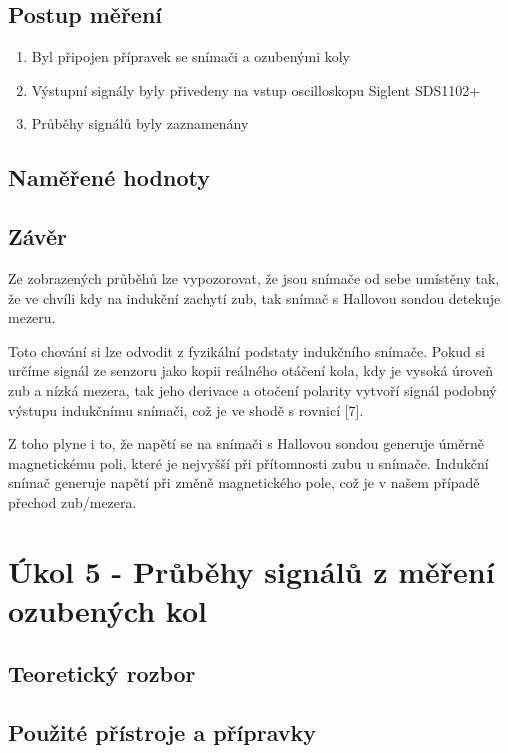 \documentclass{protokol}
\begin{document}
    \subsection{Postup měření}
            \begin{enumerate}
            \item Byl připojen přípravek se snímači a ozubenými koly
            \item Výstupní signály byly přivedeny na vstup oscilloskopu Siglent SDS1102+
            \item Průběhy signálů byly zaznamenány
        \end{enumerate}
        
    \pagebreak
    \subsection{Naměřené hodnoty}

    \subsection{Závěr}
        Ze zobrazených průběhů lze vypozorovat, že jsou snímače od sebe umístěny tak, že ve chvíli kdy na indukční zachytí zub, tak snímač s Hallovou sondou detekuje mezeru.

        Toto chování si lze odvodit z fyzikální podstaty indukčního snímače. Pokud si určíme signál ze senzoru jako kopii reálného otáčení kola, kdy je vysoká úroveň zub a nízká mezera, tak jeho derivace a otočení polarity vytvoří signál podobný výstupu indukčnímu snímači, což je ve shodě s rovnicí [7].

        Z toho plyne i to, že napětí se na snímači s Hallovou sondou generuje úměrně magnetickému poli, které je nejvyšší při přítomnosti zubu u snímače. Indukční snímač generuje napětí při změně magnetického pole, což je v našem případě přechod zub/mezera.

\pagebreak

\section{Úkol 5 - Průběhy signálů z měření ozubených kol}
    \subsection{Teoretický rozbor}
    \subsection{Použité přístroje a přípravky}
\end{document}
